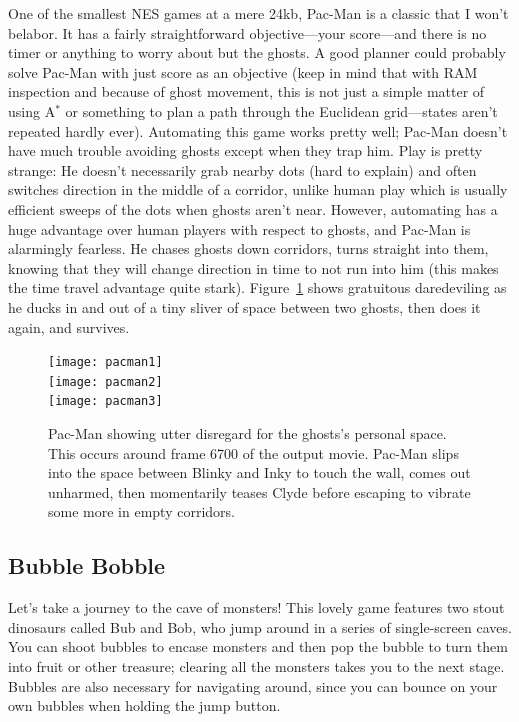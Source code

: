 \documentclass[twocolumn]{article}
\begin{document}
One of the smallest NES games at a mere 24kb, Pac-Man is a classic
that I won't belabor. It has a fairly straightforward objective---your
score---and there is no timer or anything to worry about but the
ghosts. A good planner could probably solve Pac-Man with just score as
an objective (keep in mind that with RAM inspection and because of
ghost movement, this is not just a simple matter of using A$^{*}$ or
something to plan a path through the Euclidean grid---states aren't
repeated hardly ever). Automating this game works pretty well; Pac-Man
doesn't have much trouble avoiding ghosts except when they trap him.
Play is pretty strange: He doesn't necessarily grab nearby dots (hard
to explain) and often switches direction in the middle of a corridor,
unlike human play which is usually efficient sweeps of the dots when
ghosts aren't near. However, automating has a huge advantage over
human players with respect to ghosts, and Pac-Man is alarmingly
fearless. He chases ghosts down corridors, turns straight into them,
knowing that they will change direction in time to not run into him
(this makes the time travel advantage quite stark).
Figure~\ref{fig:pacman} shows gratuitous daredeviling as he ducks in
and out of a tiny sliver of space between two ghosts, then does it
again, and survives.


\begin{figure}[ht]
\begin{center}
\texttt{[image: pacman1]} \\[0.3em]
\texttt{[image: pacman2]} \\[0.3em]
\texttt{[image: pacman3]}
\end{center}\vspace{-0.1in}
\caption{Pac-Man showing utter disregard for the ghosts's personal
  space. This occurs around frame 6700 of the output movie. Pac-Man
  slips into the space between Blinky and Inky to touch the wall,
  comes out unharmed, then momentarily teases Clyde before escaping
  to vibrate some more in empty corridors.}
\label{fig:pacman}
\end{figure}

\subsection{Bubble Bobble}

Let's take a journey to the cave of monsters! This lovely game
features two stout dinosaurs called Bub and Bob, who jump around in a
series of single-screen caves. You can shoot bubbles to encase
monsters and then pop the bubble to turn them into fruit or other
treasure; clearing all the monsters takes you to the next stage.
Bubbles are also necessary for navigating around, since you can bounce
on your own bubbles when holding the jump button.
\end{document}
